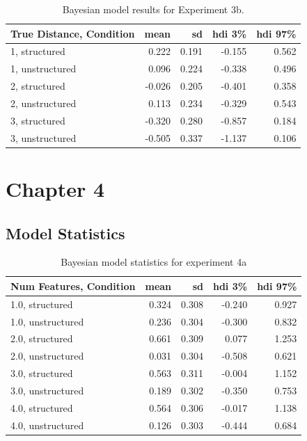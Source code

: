 \begin{table}[H]
\end{table}

\begin{table}[H]
    \centering
    \caption{Bayesian model results for Experiment 3b.}
    \label{lab:exp3-bayesmodel-stats}
    \begin{tabular}{lrrrr}
        \toprule
        True Distance, Condition & mean & sd & hdi 3\% & hdi 97\% \\
        \midrule
        1, structured & 0.222 & 0.191 & -0.155 & 0.562 \\
        1, unstructured & 0.096 & 0.224 & -0.338 & 0.496 \\
        2, structured & -0.026 & 0.205 & -0.401 & 0.358 \\
        2, unstructured & 0.113 & 0.234 & -0.329 & 0.543 \\
        3, structured & -0.320 & 0.280 & -0.857 & 0.184 \\
        3, unstructured & -0.505 & 0.337 & -1.137 & 0.106 \\
        \bottomrule
        \end{tabular}
        
\end{table}

\chapter{Chapter 4}
\section{Model Statistics}
\begin{table}[H]
    \centering
    \caption{Bayesian model statistics for experiment 4a}
    \label{tab:exp4-bayes-model-results}
    \begin{tabular}{lrrrr}
        \toprule
        Num Features, Condition & mean & sd & hdi 3\% & hdi 97\% \\
        \midrule
        1.0, structured & 0.324 & 0.308 & -0.240 & 0.927 \\
        1.0, unstructured & 0.236 & 0.304 & -0.300 & 0.832 \\
        2.0, structured & 0.661 & 0.309 & 0.077 & 1.253 \\
        2.0, unstructured & 0.031 & 0.304 & -0.508 & 0.621 \\
        3.0, structured & 0.563 & 0.311 & -0.004 & 1.152 \\
        3.0, unstructured & 0.189 & 0.302 & -0.350 & 0.753 \\
        4.0, structured & 0.564 & 0.306 & -0.017 & 1.138 \\
        4.0, unstructured & 0.126 & 0.303 & -0.444 & 0.684 \\
        \bottomrule
        \end{tabular}
        
\end{table}

